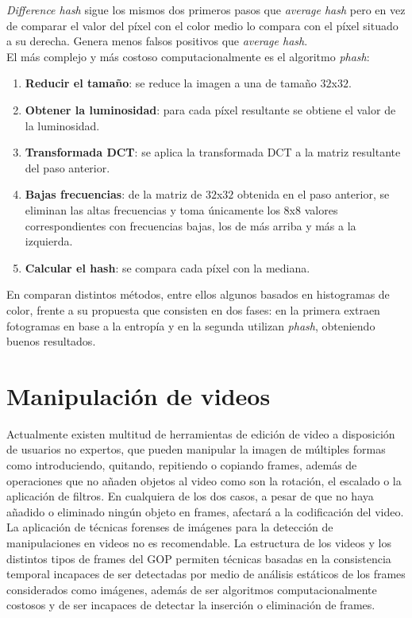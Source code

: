 \textit{Difference hash} sigue los mismos dos primeros pasos que \textit{average hash} pero en vez de comparar el valor del píxel con el color medio lo compara con el píxel situado a su derecha. Genera menos falsos positivos que \textit{average hash}. \\

El más complejo y más costoso computacionalmente es el algoritmo \textit{phash}:
\begin{enumerate}
\item \textbf{Reducir el tama\~no}: se reduce la imagen a una de tama\~no $32$x$32$.
\item \textbf{Obtener la luminosidad}: para cada píxel resultante se obtiene el valor de la luminosidad.
\item \textbf{Transformada DCT}: se aplica la transformada DCT a la matriz resultante del paso anterior.
\item \textbf{Bajas frecuencias}: de la matriz de $32$x$32$ obtenida en el paso anterior, se eliminan las altas frecuencias y toma únicamente los $8$x$8$ valores correspondientes con frecuencias bajas, los de más arriba y más a la izquierda.
\item \textbf{Calcular el hash}: se compara cada píxel con la mediana.
\end{enumerate}

En \cite{zhang:2017} comparan distintos métodos, entre ellos algunos basados en histogramas de color, frente a su propuesta que consisten en dos fases: en la primera extraen fotogramas en base a la entropía y en la segunda utilizan \textit{phash}, obteniendo buenos resultados. \\

\section{Manipulación de videos}
Actualmente existen multitud de herramientas de edición de video a disposición de usuarios no expertos, que pueden manipular la imagen de múltiples formas como introduciendo, quitando, repitiendo o copiando frames, además de operaciones que no a\~naden objetos al video como son la rotación, el escalado o la aplicación de filtros. En cualquiera de los dos casos, a pesar de que no haya a\~nadido o eliminado ningún objeto en frames, afectará a la codificación del video. \\

La aplicación de técnicas forenses de imágenes para la detección de manipulaciones en videos no es recomendable. La estructura de los videos y los distintos tipos de frames del GOP permiten técnicas basadas en la consistencia temporal incapaces de ser detectadas por medio de análisis estáticos de los frames considerados como imágenes, además de ser algoritmos computacionalmente costosos y de ser incapaces de detectar la inserción o eliminación de frames\cite{bestagini:2012}. \\

